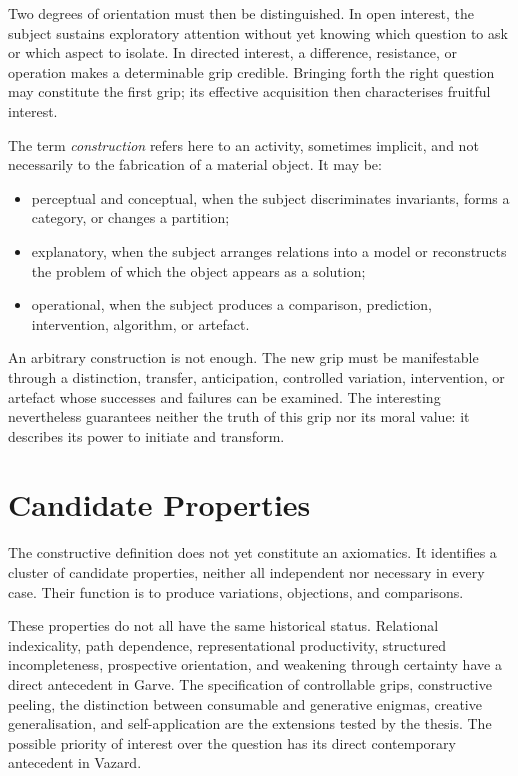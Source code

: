 \documentclass[11pt,a4paper]{article}
\begin{document}
Two degrees of orientation must then be distinguished. In open interest, the
subject sustains exploratory attention without yet knowing which question to ask
or which aspect to isolate. In directed interest, a difference, resistance, or
operation makes a determinable grip credible. Bringing forth the right question
may constitute the first grip; its effective acquisition then characterises
fruitful interest.

The term \emph{construction} refers here to an activity, sometimes implicit, and
not necessarily to the fabrication of a material object. It may be:

\begin{itemize}
  \item perceptual and conceptual, when the subject discriminates invariants,
        forms a category, or changes a partition;
  \item explanatory, when the subject arranges relations into a model or
        reconstructs the problem of which the object appears as a solution;
  \item operational, when the subject produces a comparison, prediction,
        intervention, algorithm, or artefact.
\end{itemize}

An arbitrary construction is not enough. The new grip must be manifestable
through a distinction, transfer, anticipation, controlled variation,
intervention, or artefact whose successes and failures can be examined. The
interesting nevertheless guarantees neither the truth of this grip nor its
moral value: it describes its power to initiate and transform.

\section{Candidate Properties}

The constructive definition does not yet constitute an axiomatics. It identifies
a cluster of candidate properties, neither all independent nor necessary in
every case. Their function is to produce variations, objections, and
comparisons.

These properties do not all have the same historical status. Relational
indexicality, path dependence, representational productivity, structured
incompleteness, prospective orientation, and weakening through certainty have a
direct antecedent in Garve. The specification of controllable grips,
constructive peeling, the distinction between consumable and generative
enigmas, creative generalisation, and self-application are the extensions tested
by the thesis. The possible priority of interest over the question has its
direct contemporary antecedent in Vazard.
\end{document}
